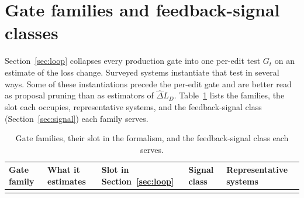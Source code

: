 \documentclass[
  11pt,
]{article}
\begin{document}
\section{Gate families and feedback-signal classes}\label{app:gates}

Section~\ref{sec:loop} collapses every production gate into one per-edit test \(G_t\) on an estimate of the loss change. Surveyed systems instantiate that test in several ways. Some of these instantiations precede the per-edit gate and are better read as proposal pruning than as estimators of \(\widehat{\Delta} L_D\). Table~\ref{tab:B-1} lists the families, the slot each occupies, representative systems, and the feedback-signal class (Section~\ref{sec:signal}) each family serves.

\begin{table}[htbp]
\caption{Gate families, their slot in the formalism, and the feedback-signal class each serves.}\label{tab:B-1}
\centering\small
\begin{tabular}{@{}
  >{\raggedright\arraybackslash}p{}
  >{\raggedright\arraybackslash}p{}
  >{\raggedright\arraybackslash}p{}
  >{\raggedright\arraybackslash}p{}
  >{\raggedright\arraybackslash}p{}@{}}
\toprule\noalign{}
\begin{minipage}[b]{\linewidth}\raggedright
Gate family
\end{minipage} & \begin{minipage}[b]{\linewidth}\raggedright
What it estimates
\end{minipage} & \begin{minipage}[b]{\linewidth}\raggedright
Slot in Section~\ref{sec:loop}
\end{minipage} & \begin{minipage}[b]{\linewidth}\raggedright
Signal class
\end{minipage} & \begin{minipage}[b]{\linewidth}\raggedright
Representative systems
\end{minipage} \\
\midrule\noalign{}



\end{tabular}
\end{table}
\end{document}
